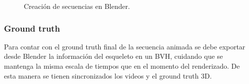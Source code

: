 \begin{figure}[ht!]
   \hspace{0.3cm}
   \caption{Creación de secuencias en Blender.}   
 \end{figure} 


 
\subsubsection*{Ground truth} 

Para contar con el ground truth final de la secuencia animada se debe exportar desde Blender la información del esqueleto en un BVH, cuidando que se mantenga la misma escala de tiempos que en el momento del renderizado. De esta manera se tienen sincronizados los videos y el ground truth 3D.

